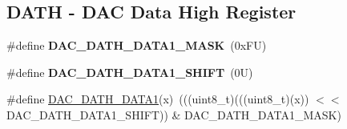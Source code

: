 \subsection*{D\+A\+TH -\/ D\+AC Data High Register}
\begin{DoxyCompactItemize}
\item 
\mbox{\label{group___d_a_c___register___masks_ga98c0e999ae86d666b5d6fa8df700ba6f}} 
\#define {\bfseries D\+A\+C\+\_\+\+D\+A\+T\+H\+\_\+\+D\+A\+T\+A1\+\_\+\+M\+A\+SK}~(0x\+F\+U)
\item 
\mbox{\label{group___d_a_c___register___masks_ga0056432036b350d3839554982acfbff1}} 
\#define {\bfseries D\+A\+C\+\_\+\+D\+A\+T\+H\+\_\+\+D\+A\+T\+A1\+\_\+\+S\+H\+I\+FT}~(0\+U)
\item 
\#define \mbox{\hyperlink{group___d_a_c___register___masks_ga22ebc926dfe59f28a37b532767780fbc}{D\+A\+C\+\_\+\+D\+A\+T\+H\+\_\+\+D\+A\+T\+A1}}(x)~(((uint8\+\_\+t)(((uint8\+\_\+t)(x)) $<$$<$ D\+A\+C\+\_\+\+D\+A\+T\+H\+\_\+\+D\+A\+T\+A1\+\_\+\+S\+H\+I\+FT)) \& D\+A\+C\+\_\+\+D\+A\+T\+H\+\_\+\+D\+A\+T\+A1\+\_\+\+M\+A\+SK)
\end{DoxyCompactItemize}
